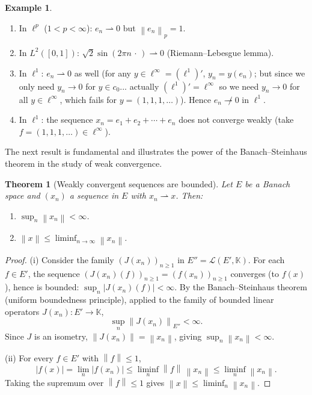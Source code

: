 \documentclass[a4paper,12pt]{book}
\newcommand{\K}{\mathbb{K}}
\newcommand{\norm}[1]{\left\| #1 \right\|}
\newcommand{\weakto}{\rightharpoonup}
\theoremstyle{definition}
\newtheorem{example}[definition]{Example}
\theoremstyle{plain}
\newtheorem{theorem}[definition]{Theorem}
\theoremstyle{remark}
\begin{document}
\begin{example}\label{ex:weak-convergence-examples}
\leavevmode
\begin{enumerate}[label=(\roman*)]
  \item In $\ell^p$ ($1<p<\infty$): $e_n\weakto 0$ but $\norm{e_n}_p=1$.
  \item In $L^2([0,1])$: $\sqrt{2}\sin(2\pi n\,\cdot\,)\weakto 0$
        (Riemann--Lebesgue lemma).
  \item In $\ell^1$: $e_n\weakto 0$ as well (for any $y\in\ell^\infty=(\ell^1)'$,
        $y_n = y(e_n)$; but since we only need $y_n\to 0$ for $y\in c_0$...
        actually $(\ell^1)'=\ell^\infty$ so we need $y_n\to 0$ for all
        $y\in\ell^\infty$, which fails for $y=(1,1,1,\ldots)$).
        Hence $e_n\not\weakto 0$ in $\ell^1$.
  \item In $\ell^1$: the sequence $x_n = e_1+e_2+\cdots+e_n$ does not converge
        weakly (take $f=(1,1,1,\ldots)\in\ell^\infty$).
\end{enumerate}
\end{example}

The next result is fundamental and illustrates the power of the
Banach--Steinhaus theorem in the study of weak convergence.

\begin{theorem}[Weakly convergent sequences are bounded]\label{thm:weak-bounded}
Let $E$ be a Banach space and $(x_n)$ a sequence in $E$ with
$x_n\weakto x$.  Then:
\begin{enumerate}[label=(\roman*)]
  \item $\sup_n\norm{x_n}<\infty$.
  \item $\norm{x}\le\liminf_{n\to\infty}\norm{x_n}$.
\end{enumerate}
\end{theorem}

\begin{proof}
(i) Consider the family $(J(x_n))_{n\ge 1}$ in $E'' = \mathcal{L}(E',\K)$.
For each $f\in E'$, the sequence $(J(x_n)(f))_{n\ge 1} = (f(x_n))_{n\ge 1}$
converges (to $f(x)$), hence is bounded:
$\sup_n |J(x_n)(f)| < \infty$.
By the Banach--Steinhaus theorem (uniform
boundedness principle), applied to the family of bounded linear operators
$J(x_n):E'\to\K$,
\[
  \sup_n \norm{J(x_n)}_{E''} < \infty.
\]
Since $J$ is an isometry, $\norm{J(x_n)}=\norm{x_n}$, giving
$\sup_n\norm{x_n}<\infty$.

(ii) For every $f\in E'$ with $\norm{f}\le 1$,
\[
  |f(x)| = \lim_n |f(x_n)| \le \liminf_n \norm{f}\,\norm{x_n}
  \le \liminf_n \norm{x_n}.
\]
Taking the supremum over $\norm{f}\le 1$ gives
$\norm{x}\le\liminf_n\norm{x_n}$.
\end{proof}
\end{document}
